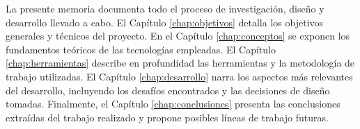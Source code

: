 La presente memoria documenta todo el proceso de investigación, diseño y desarrollo llevado a cabo. El Capítulo \ref{chap:objetivos} detalla los objetivos generales y técnicos del proyecto. En el Capítulo \ref{chap:conceptos} se exponen los fundamentos teóricos de las tecnologías empleadas. El Capítulo \ref{chap:herramientas} describe en profundidad las herramientas y la metodología de trabajo utilizadas. El Capítulo \ref{chap:desarrollo} narra los aspectos más relevantes del desarrollo, incluyendo los desafíos encontrados y las decisiones de diseño tomadas. Finalmente, el Capítulo \ref{chap:conclusiones} presenta las conclusiones extraídas del trabajo realizado y propone posibles líneas de trabajo futuras.